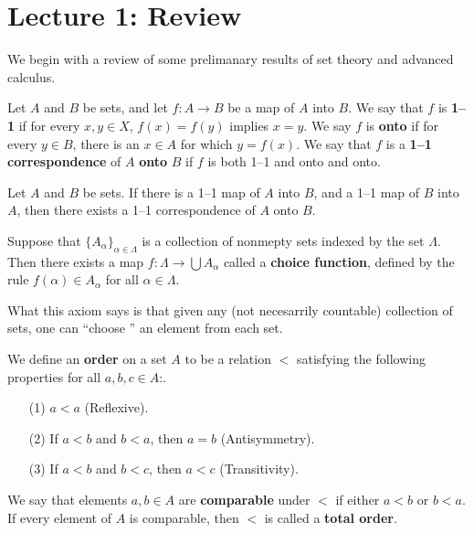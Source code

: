 \section*{Lecture 1: Review}

We begin with a review of some prelimanary results of set theory and advanced
calculus.

\begin{definition}
    Let $A$ and $B$ be sets, and let $f:A \rightarrow B$ be a map of $A$ into
   $B$. We say that $f$ is  \textbf{1--1} if for every  $x,y \in X$,  $f(x)=f(y)$
   implies $x=y$. We say $f$ is \textbf{onto} if for every $y \in B$, there is
   an  $x \in A$ for which $y=f(x)$. We say that $f$ is a  \textbf{1--1
   correspondence} of $A$  \textbf{onto} $B$ if  $f$ is both 1--1 and onto and
   onto.
\end{definition}

\begin{theorem}\label{thm_1}
    Let $A$ and  $B$ be sets. If there is a 1--1 map of $A$ into  $B$, and a
    1--1 map of  $B$ into $A$, then there exists a 1--1 correspondence of
    $A$ onto  $B$.
\end{theorem}

\begin{axiom}\label{axm_1}
    Suppose that $\{A_\alpha\}_{\alpha \in \Lambda}$ is a collection of nonmepty
    sets indexed by the set $\Lambda$. Then there exists a map $f:\Lambda
    \rightarrow \bigcup{A_\alpha}$ called a \textbf{choice function}, defined by
    the rule $f(\alpha) \in A_\alpha$ for all $\alpha \in \Lambda$.
\end{axiom}
\begin{remark}
    What this axiom says is that given any (not necesarrily countable)
    collection of sets, one can ``choose '' an element from each set.
\end{remark}

\begin{definition}
    We define an \textbf{order} on a set $A$ to be a relation  $<$ satisfying
    the following properties for all $a,b,c \in A$:.
    \begin{enumerate}
        \item[(1)] $a<a$  (Reflexive).

        \item[(2)] If $a<b$ and  $b<a$, then  $a=b$  (Antisymmetry).

        \item[(3)] If $a<b$ and  $b<c$, then  $a<c$  (Transitivity).
    \end{enumerate}
     We say that elements $a,b \in A$ are \textbf{comparable} under $<$ if
     either $a<b$ or $b<a$. If every element of $A$ is comparable, then  $<$ is
     called a  \textbf{total order}.
\end{definition}

